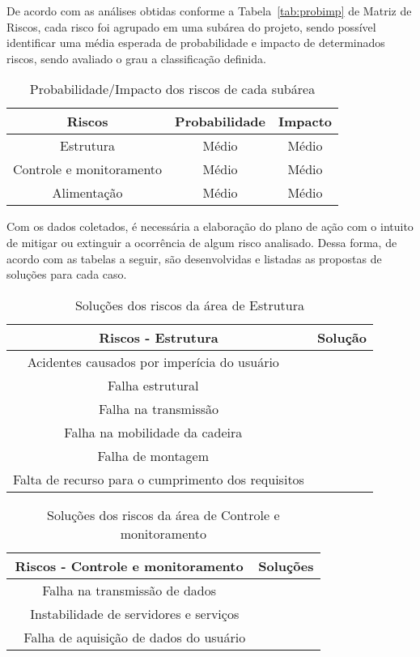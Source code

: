 De acordo com as análises obtidas conforme a Tabela~\ref{tab:probimp} de Matriz de Riscos,
cada risco foi agrupado em uma subárea do projeto, sendo possível identificar uma
média esperada de probabilidade e impacto de determinados riscos, sendo avaliado o
grau a classificação definida.

\begin{table}[h]
\centering
\vspace{0.5cm}
\begin{tabular}{|c|c|c|}
\hline
Riscos                    & Probabilidade & Impacto \\
\hline
Estrutura                 & Médio         & Médio \\
Controle e monitoramento  & Médio         & Médio \\
Alimentação               & Médio         & Médio \\
\hline
\end{tabular}
\caption{Probabilidade/Impacto dos riscos de cada subárea}
\label{tab:probimparea}
\end{table}

Com os dados coletados, é necessária a elaboração do plano de ação com o
intuito de mitigar ou extinguir a ocorrência de algum risco analisado. Dessa forma, de
acordo com as tabelas a seguir, são desenvolvidas e listadas as propostas de soluções
para cada caso.

\begin{table}[h]
\centering
\vspace{0.5cm}
\begin{tabular}{|c|c|}
\hline
Riscos - Estrutura                                     & Solução \\
\hline
Acidentes causados por imperícia do usuário            & \\
Falha estrutural                                       & \\
Falha na transmissão                                   & \\
Falha na mobilidade da cadeira                         & \\
Falha de montagem                                      & \\
Falta de recurso para o cumprimento dos requisitos     & \\
\hline
\end{tabular}
\caption{Soluções dos riscos da área de Estrutura}
\label{tab:riscosubareaest}
\end{table}

\begin{table}[h]
\centering
\vspace{0.5cm}
\begin{tabular}{|c|c|}
\hline
Riscos - Controle e monitoramento         & Soluções \\
\hline
Falha na transmissão de dados             & \\ 
Instabilidade de servidores e serviços    & \\ 
Falha de aquisição de dados do usuário    & \\
\hline
\end{tabular}
\caption{Soluções dos riscos da área de Controle e monitoramento}
\label{tab:riscosubareacont}
\end{table}

